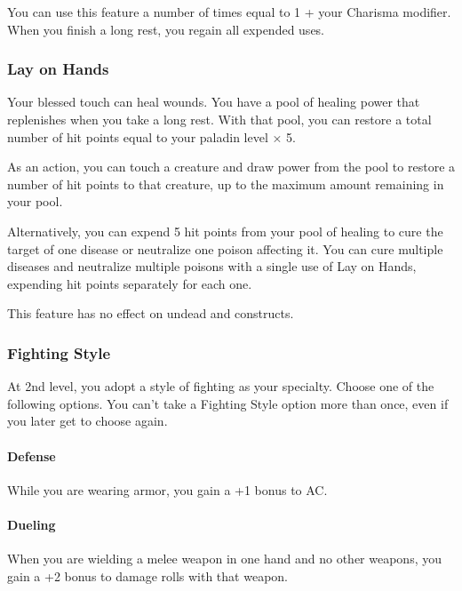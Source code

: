 \documentclass[
]{article}
\begin{document}
You can use this feature a number of times equal to 1 + your Charisma
modifier. When you finish a long rest, you regain all expended uses.

\hypertarget{lay-on-hands}{%
\subsubsection{Lay on Hands}\label{lay-on-hands}}

Your blessed touch can heal wounds. You have a pool of healing power
that replenishes when you take a long rest. With that pool, you can
restore a total number of hit points equal to your paladin level × 5.

As an action, you can touch a creature and draw power from the pool to
restore a number of hit points to that creature, up to the maximum
amount remaining in your pool.

Alternatively, you can expend 5 hit points from your pool of healing to
cure the target of one disease or neutralize one poison affecting it.
You can cure multiple diseases and neutralize multiple poisons with a
single use of Lay on Hands, expending hit points separately for each
one.

This feature has no effect on undead and constructs.

\hypertarget{fighting-style}{%
\subsubsection{Fighting Style}\label{fighting-style}}

At 2nd level, you adopt a style of fighting as your specialty. Choose
one of the following options. You can't take a Fighting Style option
more than once, even if you later get to choose again.

\hypertarget{defense}{%
\paragraph{Defense}\label{defense}}

While you are wearing armor, you gain a +1 bonus to AC.

\hypertarget{dueling}{%
\paragraph{Dueling}\label{dueling}}

When you are wielding a melee weapon in one hand and no other weapons,
you gain a +2 bonus to damage rolls with that weapon.
\end{document}
